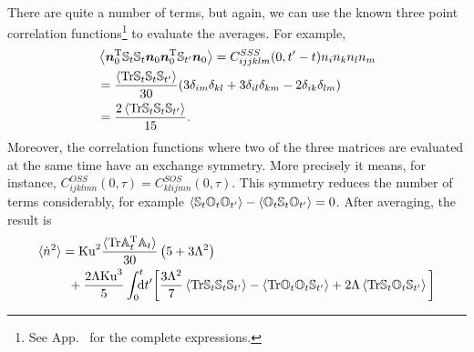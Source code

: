 \documentclass[thesis.tex]{subfiles}
\begin{document}
\begin{align*}
\end{align*}
There are quite a number of terms, but again, we can use the known three point correlation functions\footnote{See App.~ for the complete expressions.} to evaluate the averages. For example, 
\begin{align*}
	&\left\langle\mbox{\boldmath$n$}_0^{\mathrm T}\mathbb{S}_t\mathbb{S}_t \mbox{\boldmath$n$}_0 \mbox{\boldmath$n$}_{0}^{\mathrm T}\mathbb{S}_{t'}\mbox{\boldmath$n$}_{0} \right\rangle
	= C^{SSS}_{ijjklm}(0, t'-t)n_in_kn_ln_m \\
	&= \frac{\left\langle\mbox{Tr} \mathbb{S}_t\mathbb{S}_{t}\mathbb{S}_{t'}\right\rangle}{30} (3 \delta_{im} \delta_{kl}+3 \delta_{il} \delta_{km}-2 \delta_{ik} \delta_{lm})\\
	&= \frac{2\left\langle\mbox{Tr} \mathbb{S}_t\mathbb{S}_{t}\mathbb{S}_{t'}\right\rangle}{15}.
\end{align*}
Moreover, the correlation functions where two of the three matrices are evaluated at the same time have an exchange symmetry. More precisely it means, for instance, $C^{OSS}_{ijklmn}(0,\tau)=C^{SOS}_{klijmn}(0,\tau)$. This symmetry reduces the number of terms considerably, for example $\langle \mathbb{S}_t \mathbb{O}_t \mathbb{O}_{t'}\rangle - \langle \mathbb{O}_t \mathbb{S}_t \mathbb{O}_{t'}\rangle =0$. After averaging, the result is
\begin{align*}
\langle \dot n^2\rangle &=\mbox{Ku}^2\frac{\langle\mbox{Tr}\mathbb{A}_t^{\mathrm T} \mathbb{A}_t\rangle}{30}\left(5 + 3 \Lambda^2\right) \\
	&\,\,\,+ \frac{2 \Lambda \mbox{Ku}^3}{5} \int_0^{t}\!\!\!\!{\rm d}t' \bigg[\frac{3 \Lambda^2}{7}\left\langle\mbox{Tr} \mathbb{S}_t\mathbb{S}_{t}\mathbb{S}_{t'}\right\rangle - \left\langle\mbox{Tr} \mathbb{O}_t\mathbb{O}_{t}\mathbb{S}_{t'}\right\rangle + 2 \Lambda \left\langle\mbox{Tr} \mathbb{S}_t\mathbb{O}_{t}\mathbb{S}_{t'}\right\rangle\bigg]
\end{align*}
\end{document}
